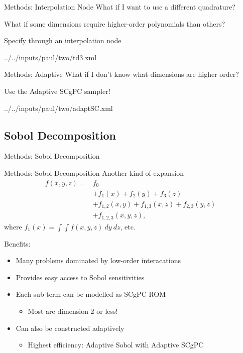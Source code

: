 \documentclass[t,9pt,svgnames]{beamer}
\begin{document}
\begin{frame}{Methods: Interpolation Node}
  \vfill
  What if I want to use a different quadrature?
  \vfill

  What if some dimensions require higher-order polynomials than others?
  \vfill

  Specify through an interpolation node
  
          {../../inputs/paul/two/td3.xml}
  \vfill
  
\end{frame}

\begin{frame}{Methods: Adaptive}
  \vfill
  What if I don't know what dimensions are higher order?
  \vfill

  Use the Adaptive SCgPC sampler!
  
          {../../inputs/paul/two/adaptSC.xml}
  \vfill
\end{frame}

\subsection{Sobol Decomposition}
\begin{frame}{Methods: Sobol Decomposition}
\end{frame}

\begin{frame}{Methods: Sobol Decomposition}
  \vfill
  Another kind of expansion
  \begin{align*}
    f(x,y,z) =& f_0 \\
             &+ f_1(x) + f_2(y) + f_3(z)\\
             &+ f_{1,2}(x,y) + f_{1,3}(x,z) + f_{2,3}(y,z) \\
             &+ f_{1,2,3}(x,y,z),
  \end{align*}
  where $f_1(x)=\int\int f(x,y,z)\ dy\ dz$, etc.
  \vfill

  Benefits:
  \vfill
  \begin{itemize}
    \item Many problems dominated by low-order interacations
  \vfill
    \item Provides easy access to Sobol sensitivities
  \vfill
    \item Each sub-term can be modelled as SCgPC ROM
    \begin{itemize}
      \item Most are dimension 2 or less!
    \end{itemize}
  \vfill
    \item Can also be constructed adaptively
    \begin{itemize}
      \item Highest efficiency: Adaptive Sobol with Adaptive SCgPC
    \end{itemize}
  \end{itemize}
  \vfill
\end{frame}
\end{document}
